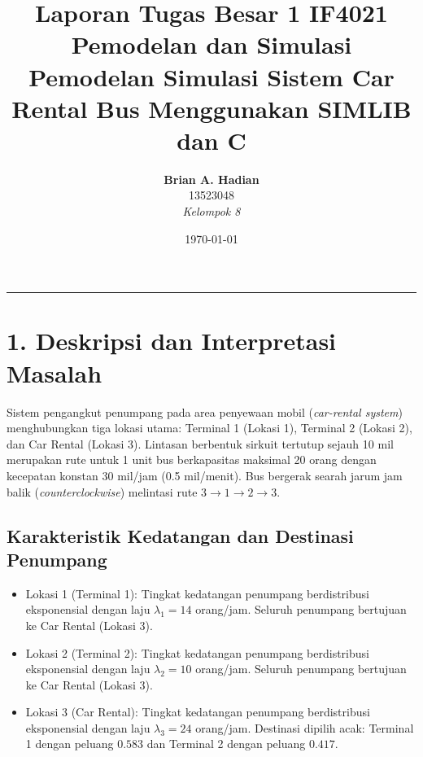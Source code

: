 \documentclass[11pt,a4paper]{article}
\title{
    \textbf{Laporan Tugas Besar 1 IF4021 Pemodelan dan Simulasi} \\
    \vspace{0.2cm}
    \large Pemodelan Simulasi Sistem Car Rental Bus Menggunakan SIMLIB dan C
}
\author{
    \textbf{Brian A. Hadian} \\ 13523048 \\
    \textit{Kelompok 8}
    \makeatother
}
\date{\today}
\begin{document}
\maketitle

\hrule
\vspace{0.5cm}

\section*{1. Deskripsi dan Interpretasi Masalah}

Sistem pengangkut penumpang pada area penyewaan mobil (\textit{car-rental system}) menghubungkan tiga lokasi utama: Terminal 1 (Lokasi 1), Terminal 2 (Lokasi 2), dan Car Rental (Lokasi 3). Lintasan berbentuk sirkuit tertutup sejauh 10 mil merupakan rute untuk 1 unit bus berkapasitas maksimal 20 orang dengan kecepatan konstan 30 mil/jam (0.5 mil/menit). Bus bergerak searah jarum jam balik (\textit{counterclockwise}) melintasi rute $3 \to 1 \to 2 \to 3$.

\subsection*{Karakteristik Kedatangan dan Destinasi Penumpang}
\begin{itemize}
    \item Lokasi 1 (Terminal 1): Tingkat kedatangan penumpang berdistribusi eksponensial dengan laju $\lambda_1 = 14$ orang/jam. Seluruh penumpang bertujuan ke Car Rental (Lokasi 3).
    \item Lokasi 2 (Terminal 2): Tingkat kedatangan penumpang berdistribusi eksponensial dengan laju $\lambda_2 = 10$ orang/jam. Seluruh penumpang bertujuan ke Car Rental (Lokasi 3).
    \item Lokasi 3 (Car Rental): Tingkat kedatangan penumpang berdistribusi eksponensial dengan laju $\lambda_3 = 24$ orang/jam. Destinasi dipilih acak: Terminal 1 dengan peluang $0.583$ dan Terminal 2 dengan peluang $0.417$.
\end{itemize}
\end{document}
